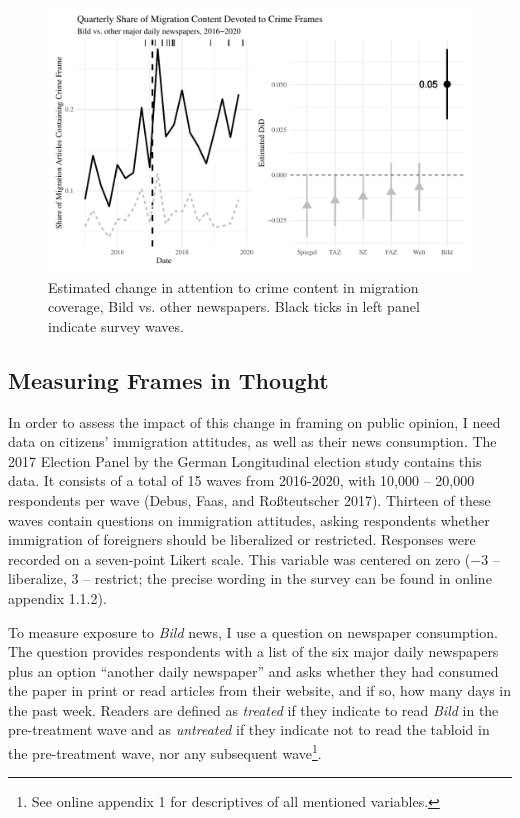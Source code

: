 \documentclass[
  12pt,
]{article}
\begin{document}
\begin{figure}[!ht]

{\centering \includegraphics{Manuscript_Framing_files/figure-latex/treatment-1} 

}

\caption{Estimated change in attention to crime content in migration coverage, Bild vs. other newspapers. Black ticks in left panel indicate survey waves.}\label{fig:treatment}
\end{figure}

\hypertarget{measuring-frames-in-thought}{%
\subsection{Measuring Frames in Thought}\label{measuring-frames-in-thought}}

In order to assess the impact of this change in framing on public opinion, I need data on citizens' immigration attitudes, as well as their news consumption. The 2017 Election Panel by the German Longitudinal election study contains this data. It consists of a total of 15 waves from 2016-2020, with 10,000 -- 20,000 respondents per wave (Debus, Faas, and Roßteutscher 2017). Thirteen of these waves contain questions on immigration attitudes, asking respondents whether immigration of foreigners should be liberalized or restricted. Responses were recorded on a seven-point Likert scale. This variable was centered on zero (\(-3\) -- liberalize, \(3\) -- restrict; the precise wording in the survey can be found in online appendix 1.1.2).

To measure exposure to \emph{Bild} news, I use a question on newspaper consumption. The question provides respondents with a list of the six major daily newspapers plus an option ``another daily newspaper'' and asks whether they had consumed the paper in print or read articles from their website, and if so, how many days in the past week. Readers are defined as \emph{treated} if they indicate to read \emph{Bild} in the pre-treatment wave and as \emph{untreated} if they indicate not to read the tabloid in the pre-treatment wave, nor any subsequent wave\footnote{See online appendix 1 for descriptives of all mentioned variables.}.
\end{document}
